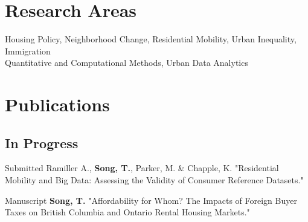 \documentclass[12pt,letterpaper]{report}
\begin{document}
    \section*{Research Areas}
      Housing Policy, Neighborhood Change, Residential Mobility, Urban Inequality, Immigration\\
      Quantitative and Computational Methods, Urban Data Analytics
  
    \section*{Publications}
    \subsection*{In Progress}
    \begin{tablist}
        \item[Submitted] \tab{}Ramiller A., \textbf{Song, T.}, Parker, M. \& Chapple, K. "Residential Mobility and Big Data: Assessing the Validity of Consumer Reference Datasets."
        \item[Manuscript] \tab{}\textbf{Song, T.} "Affordability for Whom? The Impacts of Foreign Buyer Taxes on British Columbia and Ontario Rental Housing Markets."
        \end{tablist}
\end{document}
